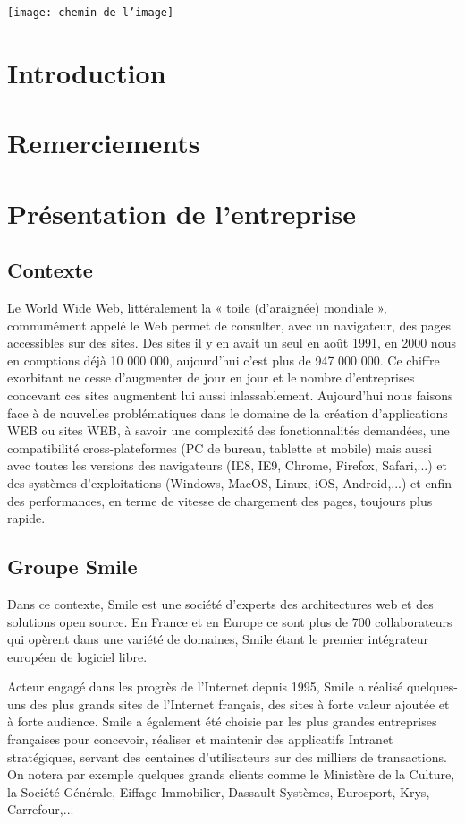\documentclass[a4paper,11pt,twoside]{report}
\begin{document}
\sffamily
\texttt{[image: chemin de l'image]}
\clearpage
\chapter*{Introduction}
\chapter*{Remerciements}
\tableofcontents
\chapter{Présentation de l'entreprise}
\section{Contexte}
Le World Wide Web, littéralement la « toile (d’araignée) mondiale », communément appelé le Web permet de consulter, avec un navigateur, des pages accessibles sur des sites. Des sites il y en avait un seul en août 1991, en 2000 nous en comptions déjà 10 000 000, aujourd'hui c'est plus de 947 000 000. Ce chiffre exorbitant ne cesse d'augmenter de jour en jour et le nombre d'entreprises concevant ces sites augmentent lui aussi inlassablement. Aujourd'hui nous faisons face à de nouvelles problématiques dans le domaine de la création d'applications WEB ou sites WEB, à savoir une complexité des fonctionnalités demandées, une compatibilité cross-plateformes (PC de bureau, tablette et mobile) mais aussi avec toutes les versions des navigateurs (IE8, IE9, Chrome, Firefox, Safari,...) et des systèmes d'exploitations (Windows, MacOS, Linux, iOS, Android,...) et enfin des performances, en terme de vitesse de chargement des pages, toujours plus rapide.
\section{Groupe Smile}
Dans ce contexte, Smile est une société d'experts des architectures web et des solutions open source. En France et en Europe ce sont plus de 700 collaborateurs qui opèrent dans une variété de domaines, Smile étant le premier intégrateur européen de logiciel libre.\newline

Acteur engagé dans les progrès de l’Internet depuis 1995, Smile a réalisé quelques-uns des plus grands sites de l'Internet français, des sites à forte valeur ajoutée et à forte audience. Smile a également été choisie par les plus grandes entreprises françaises pour concevoir, réaliser et maintenir des applicatifs Intranet stratégiques, servant des centaines d'utilisateurs sur des milliers de transactions. On notera par exemple quelques grands clients comme le Ministère de la Culture, la Société Générale, Eiffage Immobilier, Dassault Systèmes, Eurosport, Krys, Carrefour,...
\end{document}
